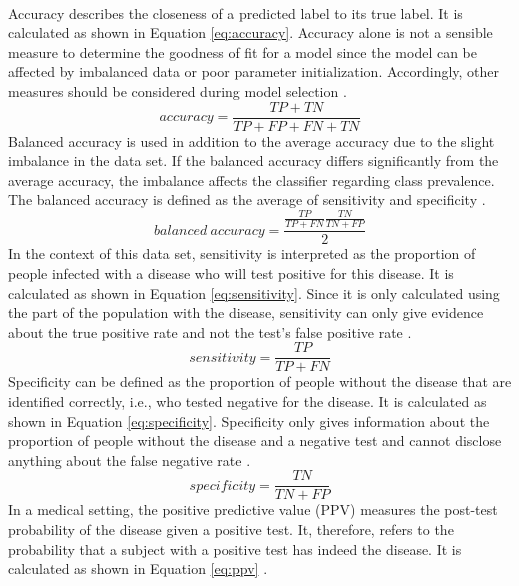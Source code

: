 \\
Accuracy describes the closeness of a predicted label to its true 
label. It is calculated as shown in Equation \ref{eq:accuracy}. Accuracy alone 
is not a sensible measure to determine the goodness of fit for a model since 
the model can be affected by imbalanced data or poor parameter initialization. 
Accordingly, other measures should be considered during model 
selection \cite{RN167}.
\begin{equation}
 accuracy = \frac{TP + TN}{TP+FP+FN+TN}
 \label{eq:accuracy}
\end{equation}
Balanced accuracy is used in addition to the average accuracy due to the slight 
imbalance in the data set. If the balanced accuracy differs significantly from 
the average accuracy, the imbalance affects the classifier regarding 
class prevalence. The balanced accuracy is defined as the average of 
sensitivity and specificity \cite{RN167, RN127}.
\begin{equation}
 balanced \ accuracy = \frac{\frac{TP}{TP+FN}\frac{TN}{TN+FP}}{2}
 \label{eq:balanced_acc}
\end{equation}
In the context of this data set, sensitivity is interpreted as the proportion 
of people infected with a disease who will test positive for this disease. It 
is calculated as shown in Equation \ref{eq:sensitivity}. Since it is only 
calculated using the part of the population with the disease, sensitivity can 
only give evidence about the true positive rate and not the test's false 
positive rate \cite{RN168}.
\begin{equation}
 sensitivity = \frac{TP}{TP+FN}
 \label{eq:sensitivity}
\end{equation}
Specificity can be defined as the proportion of people without the disease that 
are identified correctly, i.e., who tested negative for the disease. It is 
calculated as shown in Equation \ref{eq:specificity}. Specificity only gives 
information about the proportion of people without the disease and a negative 
test and cannot disclose anything about the false negative 
rate \cite{RN168}.
\begin{equation}
 specificity = \frac{TN}{TN+FP}
 \label{eq:specificity}
\end{equation}
In a medical setting, the positive predictive value (PPV) measures the 
post-test probability of the disease given a positive test. It, therefore, 
refers to the probability that a subject with a positive test has indeed the 
disease. It is calculated as shown in Equation \ref{eq:ppv} \cite{RN168}.
